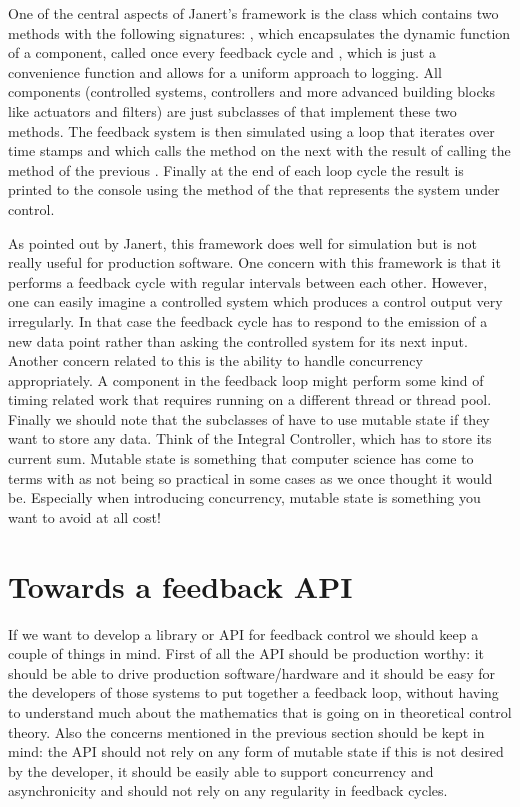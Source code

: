 One of the central aspects of Janert's framework is the  class which contains two methods with the following signatures: , which encapsulates the dynamic function of a component, called once every feedback cycle and , which is just a convenience function and allows for a uniform approach to logging. All components (controlled systems, controllers and more advanced building blocks like actuators and filters) are just subclasses of  that implement these two methods. The feedback system is then simulated using a loop that iterates over time stamps and which calls the  method on the next  with the result of calling the  method of the previous . Finally at the end of each loop cycle the result is printed to the console using the  method of the  that represents the system under control.

As pointed out by Janert, this framework does well for simulation but is not really useful for production software. One concern with this framework is that it performs a feedback cycle with regular intervals between each other. However, one can easily imagine a controlled system which produces a control output very irregularly. In that case the feedback cycle has to respond to the emission of a new data point rather than asking the controlled system for its next input. Another concern related to this is the ability to handle concurrency appropriately. A component in the feedback loop might perform some kind of timing related work that requires running on a different thread or thread pool. Finally we should note that the subclasses of  have to use mutable state if they want to store any data. Think of the Integral Controller, which has to store its current sum. Mutable state is something that computer science has come to terms with as not being so practical in some cases as we once thought it would be. Especially when introducing concurrency, mutable state is something you want to avoid at all cost! 

\section{Towards a feedback API}
If we want to develop a library or API for feedback control we should keep a couple of things in mind. First of all the API should be production worthy: it should be able to drive production software/hardware and it should be easy for the developers of those systems to put together a feedback loop, without having to understand much about the mathematics that is going on in theoretical control theory. Also the concerns mentioned in the previous section should be kept in mind: the API should not rely on any form of mutable state if this is not desired by the developer, it should be easily able to support concurrency and asynchronicity and should not rely on any regularity in feedback cycles.

